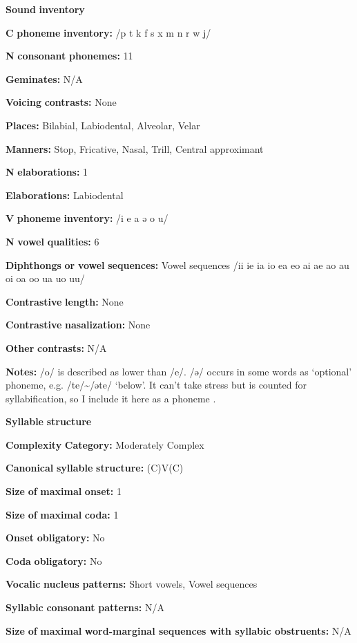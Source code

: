 \textbf{Sound} \textbf{inventory}

\textbf{C} \textbf{phoneme} \textbf{inventory:} /p t k f s x m n r w j/

\textbf{N} \textbf{consonant} \textbf{phonemes:} 11

\textbf{Geminates:} N/A

\textbf{Voicing} \textbf{contrasts:} None

\textbf{Places:} Bilabial, Labiodental, Alveolar, Velar

\textbf{Manners:} Stop, Fricative, Nasal, Trill, Central approximant

\textbf{N} \textbf{elaborations:} 1

\textbf{Elaborations:} Labiodental

\textbf{V} \textbf{phoneme} \textbf{inventory:} /i e a ə o u/

\textbf{N} \textbf{vowel} \textbf{qualities:} 6

\textbf{Diphthongs} \textbf{or} \textbf{vowel} \textbf{sequences:} Vowel sequences /ii ie ia io ea eo ai ae ao au oi oa oo ua uo uu/

\textbf{Contrastive} \textbf{length:} None

\textbf{Contrastive} \textbf{nasalization:} None

\textbf{Other} \textbf{contrasts:} N/A

\textbf{Notes:} /o/ is described as lower than /e/. /ə/ occurs in some words as ‘optional’ phoneme, e.g. /te/{\textasciitilde}/əte/ ‘below’. It can’t take stress but is counted for syllabification, so I include it here as a phoneme \citep[15-18]{Dol2007}.

\textbf{Syllable} \textbf{structure}

\textbf{Complexity} \textbf{Category:} Moderately Complex

\textbf{Canonical} \textbf{syllable} \textbf{structure:} (C)V(C) \citep[34-8]{Dol2007}

\textbf{Size} \textbf{of} \textbf{maximal} \textbf{onset:} 1

\textbf{Size} \textbf{of} \textbf{maximal} \textbf{coda:} 1

\textbf{Onset} \textbf{obligatory:} No

\textbf{Coda} \textbf{obligatory:} No

\textbf{Vocalic} \textbf{nucleus} \textbf{patterns:} Short vowels, Vowel sequences

\textbf{Syllabic} \textbf{consonant} \textbf{patterns:} N/A

\textbf{Size} \textbf{of} \textbf{maximal} \textbf{word{}-marginal sequences with syllabic obstruents:} N/A

